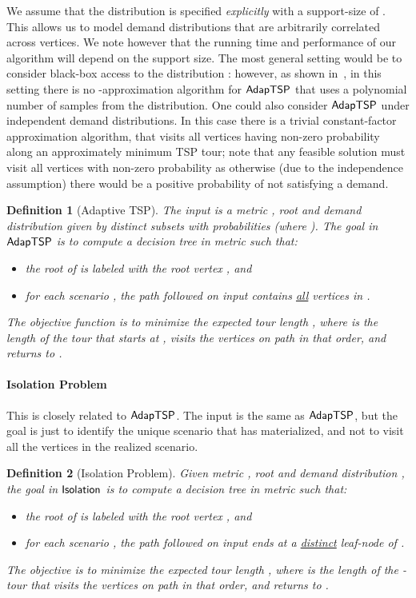 \documentclass[11pt]{article}
\newtheorem{definition}{Definition}
\def\isoprob{\ensuremath{{\sf Isolation}}\xspace}
\def\stsp{\ensuremath{{\sf AdapTSP}}\xspace}
\begin{document}
We assume that the distribution  is specified {\em explicitly} with a support-size of .
This allows us to model demand distributions that are arbitrarily correlated across vertices. We note however that the
running time and performance of our algorithm will depend on the support size. The most general setting would be to consider black-box access to the distribution : however, as shown
in~\cite{Vish-thesis}, in this setting there is no -approximation algorithm for \stsp  
that uses a polynomial number of samples from the distribution.
 One could also consider \stsp under independent demand distributions. In this case there is a trivial constant-factor approximation algorithm, that visits all vertices having non-zero probability along an approximately minimum TSP tour; note that any feasible solution must visit all vertices with non-zero probability as otherwise (due to the independence assumption) there would be a positive probability of not satisfying a demand. 
 
\begin{definition}[Adaptive TSP]\label{def:stsp} The input is a metric , root  and demand distribution 
given by  distinct subsets  with probabilities
 (where ). The goal in \stsp 
is to compute a decision tree  in metric  such that:
  \begin{itemize}
  \item the root of  is labeled with the root vertex , and
  \item for each scenario , the path  followed on input 
   contains \underline{all} vertices in .
  \end{itemize}
  The objective function is to minimize the expected tour length
  , where  is
  the length of the tour that starts at , visits the vertices on path
   in that order, and returns to .
\end{definition}



\paragraph{Isolation Problem}
This is closely related to \stsp. The input is  the same as \stsp, but the goal
is just to identify the unique scenario that 
has materialized, and not to visit all the vertices in the realized scenario.
\smallskip
\begin{definition}[Isolation Problem]\label{def:iso}
Given metric , root  and demand distribution , the goal in \isoprob is to compute a decision tree  in
metric  such that:
  \begin{itemize}
  \item the root of  is labeled with the root vertex , and
  \item for each scenario , the path  followed on input  ends at a \underline{distinct} leaf-node of .
    \end{itemize}
The objective  is to
  minimize the expected tour length , where  is the length of the -tour that visits the vertices on path  in that order, and returns to .
\end{definition}
\smallskip
\end{document}
